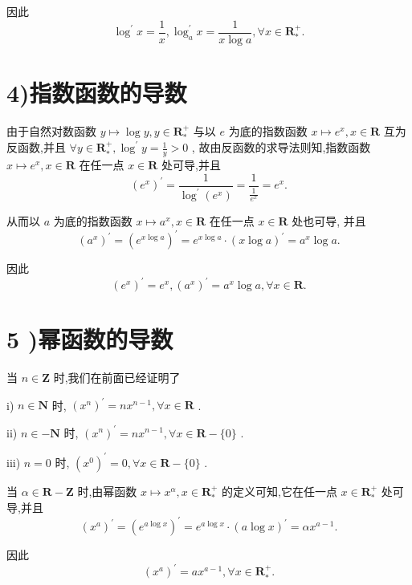因此
$${\log }^{\prime }x = \frac{1}{x},{\log }_{a}^{\prime }x = \frac{1}{x\log a},\forall x \in  {\mathbf{R}}_{ * }^{ + }.$$

\section*{4)指数函数的导数}

由于自然对数函数 $y \mapsto  \log y,y \in  {\mathbf{R}}_{ * }^{ + }$ 与以 $e$ 为底的指数函数 $x \mapsto  {e}^{x},x \in  \mathbf{R}$ 互为反函数,并且 $\forall y \in  {\mathbf{R}}_{ * }^{ + },{\log }^{\prime }y = \frac{1}{y} > 0$ , 故由反函数的求导法则知,指数函数 $x \mapsto  {e}^{x},x \in  \mathbf{R}$ 在任一点 $x \in  \mathbf{R}$ 处可导,并且
$${\left( {e}^{x}\right) }^{\prime } = \frac{1}{{\log }^{\prime }\left( {e}^{x}\right) } = \frac{1}{\frac{1}{{e}^{x}}} = {e}^{x}.$$

从而以 $a$ 为底的指数函数 $x \mapsto  {a}^{x},x \in  \mathbf{R}$ 在任一点 $x \in  \mathbf{R}$ 处也可导, 并且
$${\left( {a}^{x}\right) }^{\prime } = {\left( {e}^{x\log a}\right) }^{\prime } = {e}^{x\log a} \cdot  {\left( x\log a\right) }^{\prime } = {a}^{x}\log a.$$

因此
$${\left( {e}^{x}\right) }^{\prime } = {e}^{x},{\left( {a}^{x}\right) }^{\prime } = {a}^{x}\log a,\forall x \in  \mathbf{R}.$$

\section*{5 )幂函数的导数}

当 $n \in  \mathbf{Z}$ 时,我们在前面已经证明了

i) $n \in  \mathbf{N}$ 时, ${\left( {x}^{n}\right) }^{\prime } = n{x}^{n - 1},\forall x \in  \mathbf{R}$ .

ii) $n \in   - \mathbf{N}$ 时, ${\left( {x}^{n}\right) }^{\prime } = n{x}^{n - 1},\forall x \in  \mathbf{R} - \{ 0\}$ .

iii) $n = 0$ 时, ${\left( {x}^{0}\right) }^{\prime } = 0,\forall x \in  \mathbf{R} - \{ 0\}$ .

当 $\alpha  \in  \mathbf{R} - \mathbf{Z}$ 时,由幂函数 $x \mapsto  {x}^{\alpha },x \in  {\mathbf{R}}_{ * }^{ + }$ 的定义可知,它在任一点 $x \in  {\mathbf{R}}_{ * }^{ + }$ 处可导,并且
$${\left( {x}^{a}\right) }^{\prime } = {\left( {e}^{a\log x}\right) }^{\prime } = {e}^{a\log x} \cdot  {\left( a\log x\right) }^{\prime } = \alpha {x}^{a - 1}.$$

因此
$${\left( {x}^{a}\right) }^{\prime } = a{x}^{a - 1},\forall x \in  {\mathbf{R}}_{ * }^{ + }.$$


